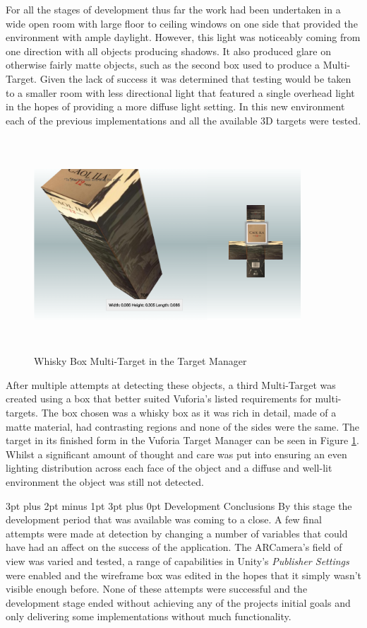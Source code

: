 \documentclass[12pt,a4paper,oneside]{article}
\makeatletter
\renewcommand\subsubsection{\@startsection {subsubsection}{1}{0mm} %
	                           {3pt plus 2pt minus 1pt} %
	                           {3pt plus 0pt} %
	                           {\normalfont\bfseries}}
\makeatother
\begin{document}
For all the stages of development thus far the work had been undertaken in a wide open room with large floor to ceiling windows on one side that provided the environment with ample daylight. However, this light was noticeably coming from one direction with all objects producing shadows. It also produced glare on otherwise fairly matte objects, such as the second box used to produce a Multi-Target. Given the lack of success it was determined that testing would be taken to a smaller room with less directional light that featured a single overhead light in the hopes of providing a more diffuse light setting. In this new environment each of the previous implementations and all the available 3D targets were tested.

\begin{figure}[!h]
	\centering
	\includegraphics[width=10cm,height=8cm,keepaspectratio]{images/caolila}
	\caption[Whisky Box Multi-Target]{Whisky Box Multi-Target in the Target Manager}
	\label{fig_caolila}
\end{figure}

After multiple attempts at detecting these objects, a third Multi-Target was created using a box that better suited Vuforia's listed requirements for multi-targets. The box chosen was a whisky box as it was rich in detail, made of a matte material, had contrasting regions and none of the sides were the same. The target in its finished form in the Vuforia Target Manager can be seen in Figure \ref{fig_caolila}. Whilst a significant amount of thought and care was put into ensuring an even lighting distribution across each face of the object and a diffuse and well-lit environment the object was still not detected.

\subsubsection{Development Conclusions}
By this stage the development period that was available was coming to a close. A few final attempts were made at detection by changing a number of variables that could have had an affect on the success of the application. The ARCamera's field of view was varied and tested, a range of capabilities in Unity's \textit{Publisher Settings} were enabled and the wireframe box was edited in the hopes that it simply wasn't visible enough before. None of these attempts were successful and the development stage ended without achieving any of the projects initial goals and only delivering some implementations without much functionality.
\end{document}
